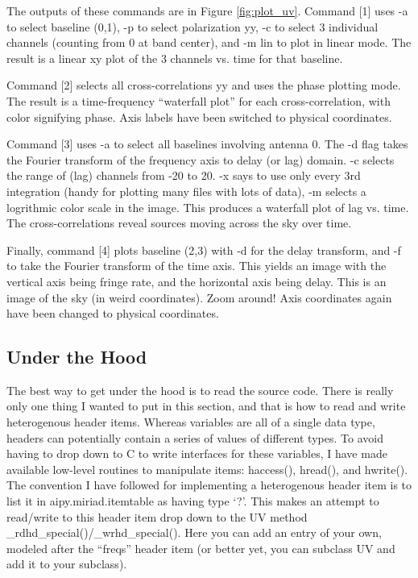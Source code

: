 The outputs of these commands are in Figure \ref{fig:plot_uv}.  Command [1]
uses -a to select baseline (0,1), -p to select polarization yy, -c to
select 3 individual channels (counting from 0 at band center), and -m lin to 
plot in linear mode.  The result
is a linear xy plot of the 3 channels vs. time for that baseline.

Command [2] selects all cross-correlations yy and uses
the phase plotting mode.  The result is a time-frequency ``waterfall plot''
for each cross-correlation, with color signifying phase.  Axis labels have
been switched to physical coordinates.

Command [3] uses -a to select all baselines involving antenna 0.  The
-d flag takes the Fourier transform of the frequency axis to delay (or lag)
domain.  -c selects the range of (lag) channels from -20 to 20.  -x says to use
only every 3rd integration (handy for plotting many files with lots of data),
-m selects a logrithmic color scale in the image.  This produces a 
waterfall plot of lag vs. time.  The
cross-correlations reveal sources moving across the sky over time.

Finally, command [4] plots baseline (2,3) with -d for the delay transform,
and -f to take the Fourier transform of the time axis.  This yields an
image with the vertical axis being fringe rate, and the horizontal axis being
delay.  This is an image of the sky (in weird coordinates).  Zoom around!
Axis coordinates again have been changed to physical coordinates.

\subsection{Under the Hood}

The best way to get under the hood is to read the source code.  There is really
only one thing I wanted to put in this section, and that is how to read and
write heterogenous header items.  Whereas variables are all of a single data
type, headers can potentially contain a series of values of different types.
To avoid having to drop down to C to write interfaces for these variables, I
have made available low-level routines to manipulate items: haccess(), hread(),
and hwrite().  The convention I have followed for implementing a heterogenous
header item is to list it in aipy.miriad.itemtable as having type `?'.  This
makes an attempt to read/write to this header item drop down to the UV method
\_rdhd\_special()/\_wrhd\_special().  Here you can add an entry of your own,
modeled after the ``freqs'' header item (or better yet, you can subclass
UV and add it to your subclass).

